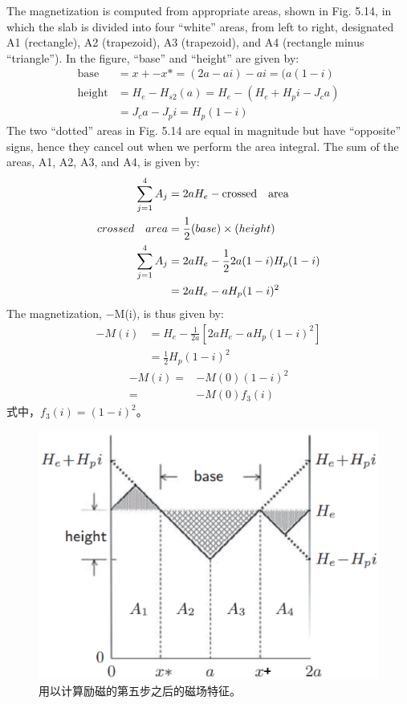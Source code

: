 The magnetization is computed from appropriate areas, shown in Fig. 5.14, in
which the slab is divided into four “white” areas, from left to right, designated A1
(rectangle), A2 (trapezoid), A3 (trapezoid), and A4 (rectangle minus “triangle”).
In the figure, “base” and “height” are given by:
\begin{align*}
\text{base}&=x+-x*=(2a-ai)-ai=(a(1-i)\\
\text{height}&=H_{e}-H_{s2}(a)=H_{e}-(H_{e}+H_{p}i-J_{c}a)\\
&=J_{c}a-J_{p}i=H_{p}(1-i)
\end{align*}
The two “dotted” areas in Fig. 5.14 are equal in magnitude but have “opposite”
signs, hence they cancel out when we perform the area integral. The sum of the
areas, A1, A2, A3, and A4, is given by:
\begin{align*}
\sum_{j=1}^{4}A_{j}&=2aH_{e}-\text{crossed\quad area}\\
crossed\quad area&=\frac{1}{2}(base)\times(height)\\
\sum_{j=1}^{4}A_{j}&=2aH_{e}-\frac{1}{2}2a(1-i)H_{p}(1-i)\\
&=2aH_{e}-aH_{p}(1-i)^{2}
\end{align*}
The magnetization, −M(i), is thus given by:
\begin{align*}%
-M(i)&=H_{e}-\frac{1}{2a}[2aH_{e}-a \grave{}H_{p}(1-i)^{2}]\\
&=\frac{1}{2}H_{p}(1-i)^{2}
\end{align*}
\begin{subequations}
	\begin{align*}
-M(i)=&-M(0)(1-i)^{2}\\
=&-M(0)f_{3}(i)
	\end{align*}
\end{subequations}
式中，$f_3(i) = (1 − i)^2$。

\begin{figure}[htbp]
	\centering
	\includegraphics[scale=0.7]{chpt5/figs/fig5.14.eps}
	\caption{用以计算励磁的第五步之后的磁场特征。}
\end{figure}

